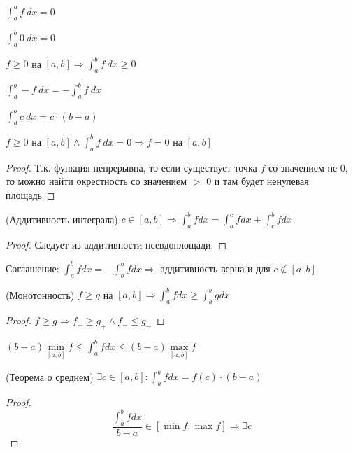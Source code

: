 \begin{properties}
    \item $\int_a^a f \ dx = 0$
    \item $\int_a^b 0 \  dx = 0$
    \item $f \geq 0$ на $[a, b] \Rightarrow \int_a^b f \ dx \geq 0$
    \item $\int_a^b - f \ dx = -\int_a^b f \ dx$
    \item $\int_a^b c \ dx = c \cdot (b - a)$
    \item $f \geq 0$ на $[a, b] \wedge \int_a^b f \ dx = 0 \Rightarrow f = 0$ на $[a, b]$
    \begin{proof}
        Т.к. функция непрерывна, то если существует точка $f$ со значением не 0,
            то можно найти окрестность со значением $>$ 0 и там будет ненулевая площадь
    \end{proof}

    \item(Аддитивность интеграла) $c \in [a, b] \Rightarrow \int_a^b f dx = 
    \int_a^c f dx +\int_c^b f dx$
    
    \begin{proof}
        Следует из аддитивности псевдоплощади.
    \end{proof}

    \begin{remark}
        Соглашение: $\int_a^b f dx = - \int_b^a f dx \Rightarrow$ аддитивность верна и 
        для $c \not \in [a, b]$
    \end{remark}

    \item(Монотонность) $f \geq g$ на $[a ,b] \Rightarrow \int_a^b f dx \geq 
    \int_a^b g dx$
    
    \begin{proof}
        $f \geq g \Rightarrow f_+ \geq g_+ \wedge f_- \leq g_-$
    \end{proof}

    \item $(b - a) \min\limits_{[a, b]} f \leq \int_a^b f dx \leq (b - a) \max\limits_{[a, b]} f$
    \item(Теорема о среднем) $\exists c \in [a, b] : \int_a^b f dx = f(c) \cdot (b-a)$
    \begin{proof}
    \[\frac {\int_a^b f dx} {b - a} \in [\min f, \max f] \Rightarrow \exists c\]
    \end{proof}


\end{properties}
